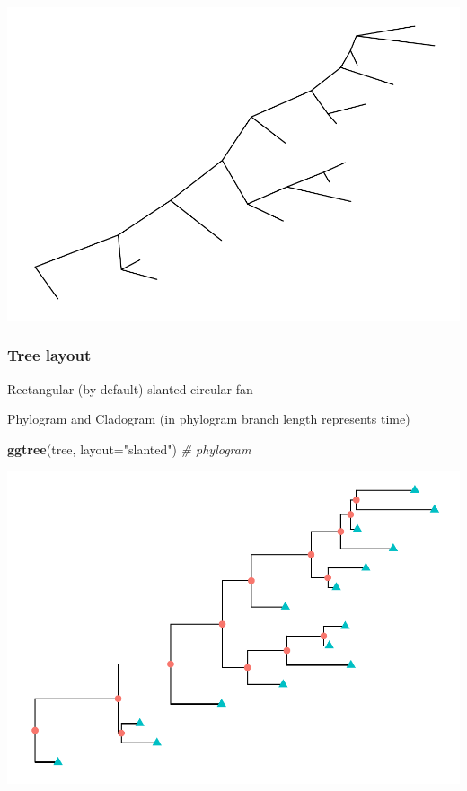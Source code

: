 \documentclass[]{article}
\newenvironment{Shaded}{\begin{snugshade}}{\end{snugshade}}
\newcommand{\KeywordTok}[1]{\textcolor[rgb]{0.13,0.29,0.53}{\textbf{#1}}}
\newcommand{\DataTypeTok}[1]{\textcolor[rgb]{0.13,0.29,0.53}{#1}}
\newcommand{\StringTok}[1]{\textcolor[rgb]{0.31,0.60,0.02}{#1}}
\newcommand{\CommentTok}[1]{\textcolor[rgb]{0.56,0.35,0.01}{\textit{#1}}}
\newcommand{\NormalTok}[1]{#1}
\begin{document}
\includegraphics{ggtree_files/figure-latex/unnamed-chunk-3-1.pdf}

\subsubsection{Tree layout}\label{tree-layout}

Rectangular (by default) slanted circular fan

Phylogram and Cladogram (in phylogram branch length represents time)

\begin{Shaded}
\begin{Highlighting}[]
\KeywordTok{ggtree}\NormalTok{(tree, }\DataTypeTok{layout=}\StringTok{"slanted"}\NormalTok{) }\CommentTok{# phylogram}
\end{Highlighting}
\end{Shaded}

\includegraphics{ggtree_files/figure-latex/unnamed-chunk-4-1.pdf}
\end{document}
